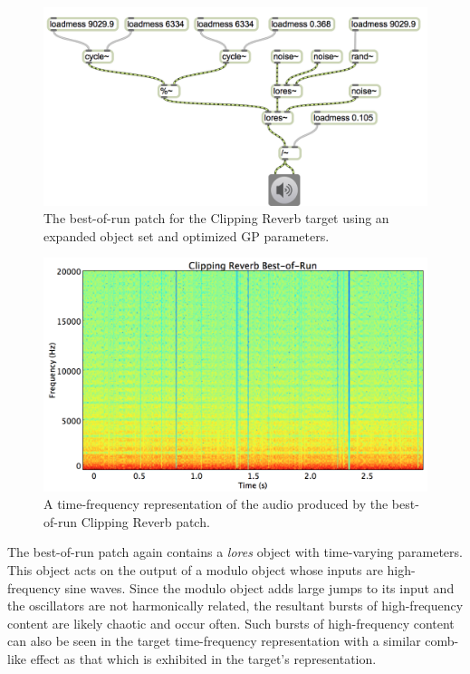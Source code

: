 \documentclass[12pt]{report} 	%
\numberwithin{figure}{chapter}
\numberwithin{table}{chapter}
\numberwithin{equation}{chapter}
\begin{document}
\begin{flushleft}
\begin{figure}[h!]
\begin{center}
\includegraphics[width=\linewidth]{ClippingReverb_Best}
\caption[Clipping reverb best-of-run patch]{The best-of-run patch for the Clipping Reverb target using an expanded object set and optimized GP parameters.}
\end{center}
\end{figure}
\begin{figure}[h!]
\begin{center}
\includegraphics[scale=0.35,width=\linewidth]{ClippingReverbBestOfRunSTFT}
\caption[Best-of-run clipping reverb time-frequency representation]{A time-frequency representation of the audio produced by the best-of-run Clipping Reverb patch.}
\end{center}
\end{figure}

The best-of-run patch again contains a \textit{lores\texttildelow{}} object with time-varying parameters. This object acts on the output of a modulo object whose inputs are high-frequency sine waves. Since the modulo object adds large jumps to its input and the oscillators are not harmonically related, the resultant bursts of high-frequency content are likely chaotic and occur often. Such bursts of high-frequency content can also be seen in the target time-frequency representation with a similar comb-like effect as that which is exhibited in the target's representation.


\end{flushleft}
\end{document}

